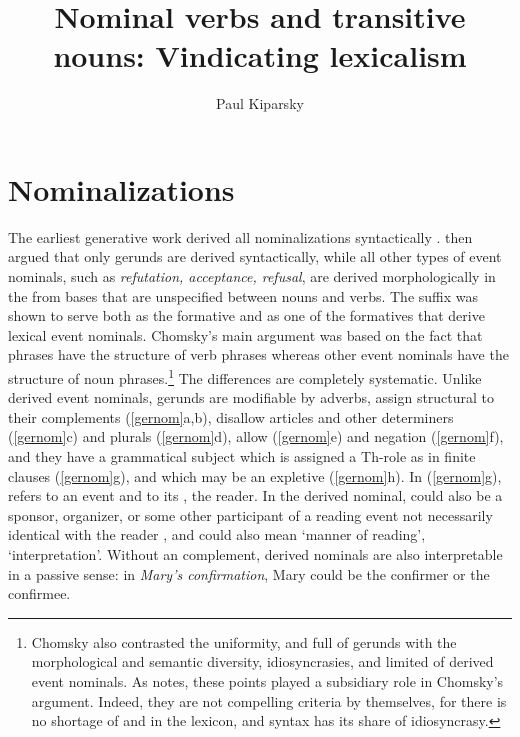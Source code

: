 \documentclass[output=paper,
modfonts
]{LSP/langsci}
\author{Paul Kiparsky\affiliation{Stanford University}}
\title{Nominal verbs and transitive nouns: Vindicating lexicalism}
\begin{document}
\maketitle


\section{Nominalizations}\label{eventnomsection}
\largerpage[-1]
The earliest generative work derived all nominalizations syntactically \citep{chomsky1955,lees1960}.  \citet{chomsky1970} then argued that only  gerunds are derived syntactically,
while all other types of event nominals, such as \textit{refutation, acceptance, refusal}, are
derived morphologically in the  from bases that are unspecified between nouns and verbs.
The suffix  was shown to serve both as the  formative and as one of the
 formatives that derive lexical event nominals.  Chomsky's main argument was based on the fact
that  phrases have the structure of verb phrases whereas other event nominals have the
structure of noun phrases.\footnote{Chomsky also contrasted the uniformity,  and full
   of gerunds with the morphological and semantic diversity, idiosyncrasies, and
  limited  of derived event nominals. As \citealt{anderson2016} notes, these points played a
  subsidiary role in Chomsky's argument.  Indeed, they are not compelling criteria by
  themselves, for there is no shortage of  and  in the lexicon, and
  syntax has its share of idiosyncrasy.} The differences are completely systematic.  Unlike
derived event nominals, gerunds are modifiable by adverbs, assign structural  to their
complements (\cref{gernom}{a,b}), disallow articles and other determiners (\cref{gernom}{c}) and
plurals (\cref{gernom}{d}), allow  (\cref{gernom}{e}) and negation (\cref{gernom}{f}), and they
have a grammatical subject which is assigned a Th-role as in finite clauses (\cref{gernom}{g}),
and which may be an expletive (\cref{gernom}{h}). In (\cref{gernom}{g}),  refers to an event and  to its , the reader. In the derived nominal,  could also be a
sponsor, organizer, or some other participant of a reading event not necessarily identical with
the reader \citep{kratzer1996,kratzer2004}, and  could also mean `manner of reading',
`interpretation'.  Without an  complement, derived nominals are also interpretable
in a passive sense: in \textit{Mary's confirmation}, Mary could be the confirmer or the
confirmee.
\end{document}
